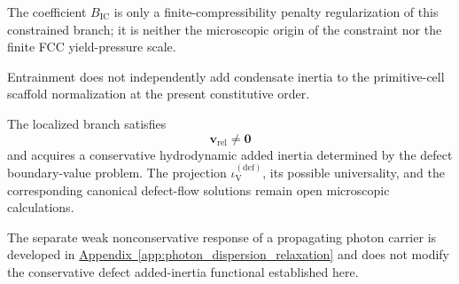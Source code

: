 The coefficient $B_{\mathrm{IC}}$ is only a finite-compressibility penalty regularization of this constrained branch; it is neither the microscopic origin of the constraint nor the finite FCC yield-pressure scale.

Entrainment does not independently add condensate inertia to the primitive-cell scaffold normalization at the present constitutive order.

The localized branch satisfies
\begin{equation}
    \mathbf{v}_{\mathrm{rel}}
    \neq
    \mathbf{0}
\end{equation}
and acquires a conservative hydrodynamic added inertia determined by the defect boundary-value problem. The projection $\iota_{\mathrm{V}}^{(\mathrm{def})}$, its possible universality, and the corresponding canonical defect-flow solutions remain open microscopic calculations.

The separate weak nonconservative response of a propagating photon carrier is developed in \hyperref[app:photon_dispersion_relaxation]{Appendix~\ref*{app:photon_dispersion_relaxation}} and does not modify the conservative defect added-inertia functional established here.
